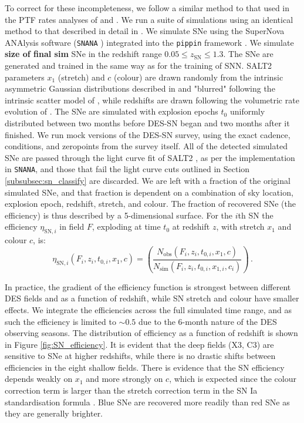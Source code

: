 \documentclass[fleqn,usenatbib]{mnras}
\begin{document}
To correct for these incompleteness, we follow a similar method to that used in the PTF rates analyses of \citet{Frohmaier2019} and \citet{Frohmaier2020}. We run a suite of simulations using an identical method to that described in detail in \citet{Vincenzi2020}. We simulate SNe using the SuperNova ANAlysis software (\texttt{SNANA} \citealt{Kessler2009a}) integrated into the \texttt{pippin} framework \citep{Hinton2020}. We simulate \textbf{size of final sim} SNe in the redshift range $0.05 \leq z_{\mathrm{SN}} \leq 1.3$. The SNe are generated and trained in the same way as for the training of SNN. SALT2 parameters $x_1$ (stretch) and $c$ (colour) are drawn randomly from the intrinsic asymmetric Gaussian distributions described in \citet{Scolnic2016} and "blurred" following the intrinsic scatter model of \citet{Guy2010}, while redshifts are drawn following the volumetric rate evolution of \citet{Frohmaier2019}. The SNe are simulated with explosion epochs $t_0$ uniformly distributed between two months before DES-SN began and two months after it finished. We run mock versions of the DES-SN survey, using the exact cadence, conditions, and zeropoints from the survey itself. All of the detected simulated SNe are passed through the light curve fit of SALT2 \citep{Betoule2014}, as per the implementation in \texttt{SNANA}, and those that fail the light curve cuts outlined in Section \ref{subsubsec:sn_classify} are discarded. We are left with a fraction of the original simulated SNe, and that fraction is dependent on a combination of sky location, explosion epoch, redshift, stretch, and colour. The fraction of recovered SNe (the efficiency) is thus described by a 5-dimensional surface. For the $i$th SN the efficiency $\eta_{\mathrm{SN}, i}$ in field $F$, exploding at time $t_0$ at redshift $z$, with stretch $x_1$ and colour $c$, is:
\begin{equation}
    \eta_{\mathrm{SN},i} (F_i,z_i,t_{0,i},x_1,c) = \left( \frac{N_{\mathrm{obs}}\left(F_i,z_i,t_{0,i},x_1,c\right)}{N_{\mathrm{sim}}\left(F_i,z_i,t_{0,i},x_{1,i},c_i\right)}\right)\,.
\end{equation}

In practice, the gradient of the efficiency function is strongest between different DES fields and as a function of redshift, while SN stretch and colour have smaller effects. We integrate the efficiencies across the full simulated time range, and as such the efficiency is limited to $\sim 0.5$ due to the 6-month nature of the DES observing seasons.
The distribution of efficiency as a function of redshift is shown in Figure \ref{fig:SN_efficiency}. It is evident that the deep fields (X3, C3) are sensitive to SNe at higher redshifts, while there is no drastic shifts between efficiencies in the eight shallow fields. There is evidence that the SN efficiency depends weakly on $x_1$ and more strongly on $c$, which is expected since the colour correction term is larger than the stretch correction term in the SN Ia standardisation formula \citep{Tripp1998}. Blue SNe are recovered more readily than red SNe as they are generally brighter. 
\end{document}
